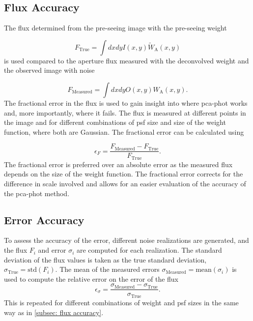 \subsection{Flux Accuracy}\label{subsec: flux accuracy}

The flux determined from the pre-seeing image with the pre-seeing weight

\begin{equation}
    F_\mathrm{True} = \int dxdy I(x,y) \tilde{W}_\mathrm{A}(x,y)
\end{equation}
is used compared to the aperture flux measured with the deconvolved weight and the observed image with noise

\begin{equation}
    F_\mathrm{Measured} = \int dxdy O(x,y) W_\mathrm{A}(x,y).
\end{equation}
The fractional error in the flux is used to gain insight into where \gls{pca-phot} works and, more importantly, where it fails. The flux is measured at different points in the image and for different combinations of \gls{psf} size and size of the weight function, where both are Gaussian. The fractional error can be calculated using

\begin{equation}
    \epsilon_F=\frac{F_\mathrm{Measured}- F_\mathrm{True}}{F_\mathrm{True}}.
\end{equation}
The fractional error is preferred over an absolute error as the measured flux depends on the size of the weight function. The fractional error corrects for the difference in scale involved and allows for an easier evaluation of the accuracy of the \gls{pca-phot} method.

\subsection{Error Accuracy}
To assess the accuracy of the error, different noise realizations are generated, and the flux $F_i$ and error $\sigma_i$ are computed for each realization. The standard deviation of the flux values is taken as the true standard deviation, $\sigma_\mathrm{True}=\mathrm{std}(F_i)$. The mean of the measured errors $\sigma_\mathrm{Measured}=\mathrm{mean}(\sigma_i)$ is used to compute the relative error on the error of the flux
\begin{equation}
    \epsilon_\sigma = \frac{\sigma_\mathrm{Measured}- \sigma_\mathrm{True}}{\sigma_\mathrm{True}}.
\end{equation}
This is repeated for different combinations of weight and \gls{psf} sizes in the same way as in \autoref{subsec: flux accuracy}.

